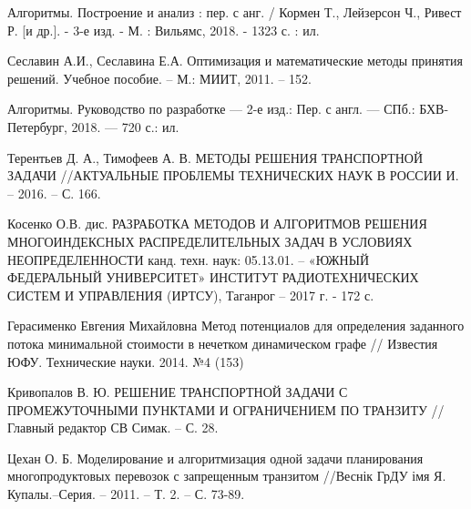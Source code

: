 \begin{thebibliography}{}
	  Алгоритмы. Построение и анализ : пер. с анг. / Кормен Т., Лейзерсон Ч., Ривест Р. [и др.]. - 3-е изд. - М. : Вильямс, 2018. - 1323 с. : ил.
	
	 Сеславин А.И., Сеславина Е.А. Оптимизация и математические методы принятия решений. Учебное пособие. – М.: МИИТ, 2011. – 152. 
	
	 Алгоритмы. Руководство по разработке --- 2-е изд.: Пер. с англ. --- СПб.: БХВ-Петербург, 2018. --- 720 с.: ил.
	
	 Терентьев Д. А., Тимофеев А. В. МЕТОДЫ РЕШЕНИЯ ТРАНСПОРТНОЙ ЗАДАЧИ //АКТУАЛЬНЫЕ ПРОБЛЕМЫ ТЕХНИЧЕСКИХ НАУК В РОССИИ И. – 2016. – С. 166.
	
	 Косенко О.В. дис. РАЗРАБОТКА МЕТОДОВ И АЛГОРИТМОВ РЕШЕНИЯ МНОГОИНДЕКСНЫХ РАСПРЕДЕЛИТЕЛЬНЫХ ЗАДАЧ В УСЛОВИЯХ НЕОПРЕДЕЛЕННОСТИ канд. техн. наук: 05.13.01. -- «ЮЖНЫЙ ФЕДЕРАЛЬНЫЙ УНИВЕРСИТЕТ» ИНСТИТУТ РАДИОТЕХНИЧЕСКИХ СИСТЕМ И УПРАВЛЕНИЯ (ИРТСУ), Таганрог -- 2017 г. - 172 с.
	
	 Герасименко Евгения Михайловна Метод потенциалов для определения заданного потока минимальной стоимости в нечетком динамическом графе // Известия ЮФУ. Технические науки. 2014. №4 (153)
	
	 Кривопалов В. Ю. РЕШЕНИЕ ТРАНСПОРТНОЙ ЗАДАЧИ С ПРОМЕЖУТОЧНЫМИ ПУНКТАМИ И ОГРАНИЧЕНИЕМ ПО ТРАНЗИТУ //Главный редактор СВ Симак. – С. 28.
	
	 Цехан О. Б. Моделирование и алгоритмизация одной задачи планирования многопродуктовых перевозок с запрещенным транзитом //Веснік ГрДУ імя Я. Купалы.–Серия. – 2011. – Т. 2. – С. 73-89.
	
\end{thebibliography}
\endgroup

\pagebreak